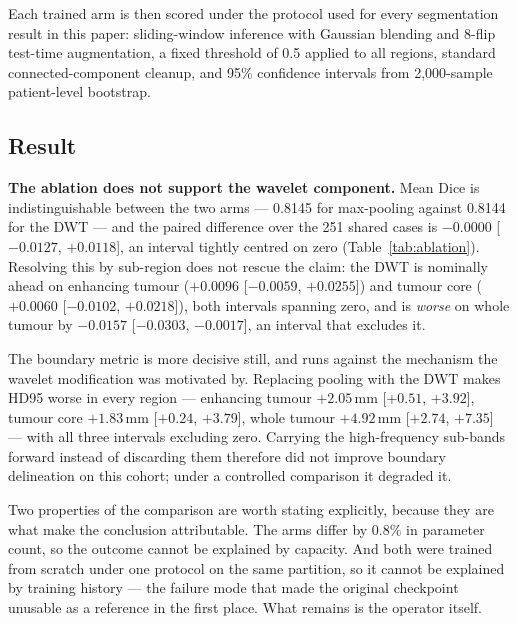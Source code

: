 \documentclass[conference]{IEEEtran}
\begin{document}
Each trained arm is then scored under the protocol used for every segmentation result in this paper: sliding-window inference with Gaussian blending and 8-flip test-time augmentation, a fixed threshold of 0.5 applied to all regions, standard connected-component cleanup, and 95\% confidence intervals from 2{,}000-sample patient-level bootstrap.

\subsection{Result}

\textbf{The ablation does not support the wavelet component.} Mean Dice is indistinguishable between the two arms --- 0.8145 for max-pooling against 0.8144 for the DWT --- and the paired difference over the 251 shared cases is $-0.0000$ [$-0.0127$, $+0.0118$], an interval tightly centred on zero (Table~\ref{tab:ablation}). Resolving this by sub-region does not rescue the claim: the DWT is nominally ahead on enhancing tumour ($+0.0096$ [$-0.0059$, $+0.0255$]) and tumour core ($+0.0060$ [$-0.0102$, $+0.0218$]), both intervals spanning zero, and is \emph{worse} on whole tumour by $-0.0157$ [$-0.0303$, $-0.0017$], an interval that excludes it.

The boundary metric is more decisive still, and runs against the mechanism the wavelet modification was motivated by. Replacing pooling with the DWT makes HD95 worse in every region --- enhancing tumour $+2.05$\,mm [$+0.51$, $+3.92$], tumour core $+1.83$\,mm [$+0.24$, $+3.79$], whole tumour $+4.92$\,mm [$+2.74$, $+7.35$] --- with all three intervals excluding zero. Carrying the high-frequency sub-bands forward instead of discarding them therefore did not improve boundary delineation on this cohort; under a controlled comparison it degraded it.

Two properties of the comparison are worth stating explicitly, because they are what make the conclusion attributable. The arms differ by 0.8\% in parameter count, so the outcome cannot be explained by capacity. And both were trained from scratch under one protocol on the same partition, so it cannot be explained by training history --- the failure mode that made the original checkpoint unusable as a reference in the first place. What remains is the operator itself.
\end{document}
